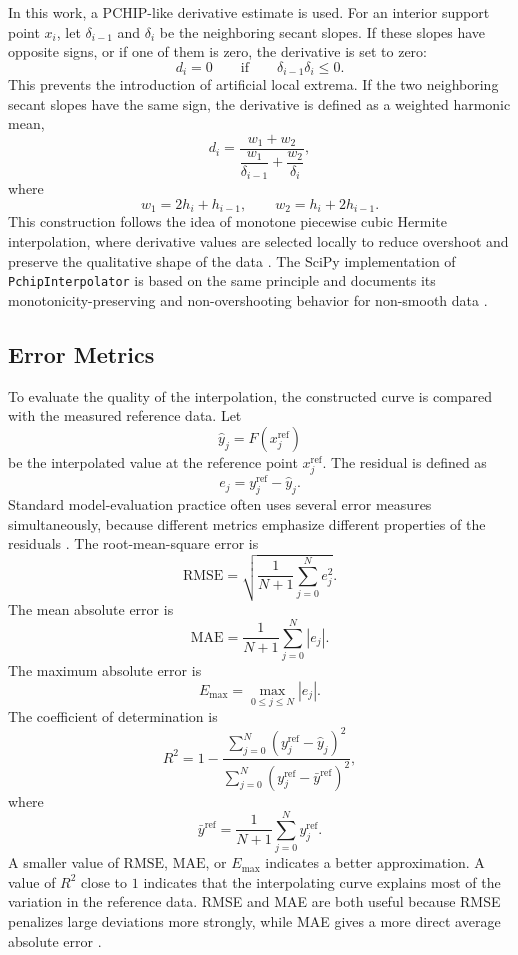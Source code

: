 \documentclass[12pt,a4paper]{article}
\begin{document}
In this work, a PCHIP-like derivative estimate is used. For an interior support point \(x_i\), let \(\delta_{i-1}\) and \(\delta_i\) be the neighboring secant slopes. If these slopes have opposite signs, or if one of them is zero, the derivative is set to zero:
\[
d_i=0
\qquad
\text{if}
\qquad
\delta_{i-1}\delta_i\leq 0.
\]
This prevents the introduction of artificial local extrema. If the two neighboring secant slopes have the same sign, the derivative is defined as a weighted harmonic mean,
\[
d_i=
\frac{w_1+w_2}
{\dfrac{w_1}{\delta_{i-1}}+\dfrac{w_2}{\delta_i}},
\]
where
\[
w_1=2h_i+h_{i-1},
\qquad
w_2=h_i+2h_{i-1}.
\]
This construction follows the idea of monotone piecewise cubic Hermite interpolation, where derivative values are selected locally to reduce overshoot and preserve the qualitative shape of the data \cite{fritsch1980monotone,fritsch1984monotone}. The SciPy implementation of \texttt{PchipInterpolator} is based on the same principle and documents its monotonicity-preserving and non-overshooting behavior for non-smooth data \cite{scipyPchip}.

\subsection{Error Metrics}

To evaluate the quality of the interpolation, the constructed curve is compared with the measured reference data. Let
\[
\widehat{y}_j=F(x_j^{\mathrm{ref}})
\]
be the interpolated value at the reference point \(x_j^{\mathrm{ref}}\). The residual is defined as
\[
e_j=y_j^{\mathrm{ref}}-\widehat{y}_j.
\]
Standard model-evaluation practice often uses several error measures simultaneously, because different metrics emphasize different properties of the residuals \cite{chai2014rmse,willmott2005mae}. The root-mean-square error is
\[
\mathrm{RMSE}=
\sqrt{
\frac{1}{N+1}
\sum_{j=0}^{N}e_j^2
}.
\]
The mean absolute error is
\[
\mathrm{MAE}=
\frac{1}{N+1}
\sum_{j=0}^{N}|e_j|.
\]
The maximum absolute error is
\[
E_{\max}=
\max_{0\leq j\leq N}|e_j|.
\]
The coefficient of determination is
\[
R^2=
1-
\frac{
\sum_{j=0}^{N}\left(y_j^{\mathrm{ref}}-\widehat{y}_j\right)^2
}{
\sum_{j=0}^{N}\left(y_j^{\mathrm{ref}}-\bar{y}^{\mathrm{ref}}\right)^2
},
\]
where
\[
\bar{y}^{\mathrm{ref}}=
\frac{1}{N+1}
\sum_{j=0}^{N}y_j^{\mathrm{ref}}.
\]
A smaller value of \(\mathrm{RMSE}\), \(\mathrm{MAE}\), or \(E_{\max}\) indicates a better approximation. A value of \(R^2\) close to \(1\) indicates that the interpolating curve explains most of the variation in the reference data. RMSE and MAE are both useful because RMSE penalizes large deviations more strongly, while MAE gives a more direct average absolute error \cite{chai2014rmse,willmott2005mae}.
\end{document}
